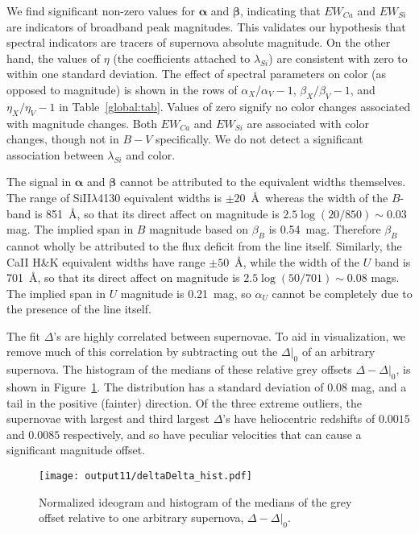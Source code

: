 \documentclass{aastex61}   	%
\begin{document}
We find significant non-zero values for $\pmb{\alpha}$ and $\pmb{\beta}$, indicating that $EW_{Ca}$ and $EW_{Si}$ are indicators of broadband
peak magnitudes.
This validates our hypothesis that spectral indicators
are tracers of supernova absolute magnitude.  On the other hand, the values of $\eta$ (the coefficients attached to $\lambda_{Si}$) are consistent with zero
to  within one standard deviation.
The effect of spectral parameters on color (as opposed to magnitude)
is shown in the rows of $\alpha_X/\alpha_V-1$,  $\beta_X/\beta_V-1$, and  $\eta_X/\eta_V-1$
in Table~\ref{global:tab}.
Values of zero signify no color changes associated with magnitude changes.
Both $EW_{Ca}$ and $EW_{Si}$ are associated with color changes, though not in $B-V$ specifically.
We do not detect a significant association between
$\lambda_{Si}$ and color.

The signal in  $\pmb{\alpha}$ and $\pmb{\beta}$ cannot be attributed to the equivalent widths themselves.
The range of SiII$\lambda$4130 equivalent widths is $\pm 20$~\AA\ whereas the width of the $B$-band is 851~\AA, so that its direct affect on magnitude
is
$2.5 \log{(20/850)} \sim 0.03$ mag.  
The implied span in $B$ magnitude based on $\beta_B$ is 0.54~mag.  Therefore $\beta_B$ cannot wholly be attributed to the flux deficit
from the line itself.
Similarly, the CaII H\&K equivalent widths have range $\pm 50$~\AA, while the width of the $U$ band is
701~\AA, so that its direct affect on magnitude
is
$2.5 \log{(50/701)} \sim 0.08$ mags.   The implied span in $U$ magnitude is  0.21~mag, so $\alpha_U$ cannot be completely due to the 
presence of the line itself.

The fit $\Delta$'s are highly correlated between supernovae.  To aid in visualization, we remove much of this
correlation by subtracting out the $\Delta|_0$ of  an arbitrary supernova.
The histogram of the medians of these relative  grey offsets $\Delta-\Delta|_0$,
is shown in Figure~\ref{hist:fig}.  The distribution
has a standard deviation of
$0.08$
mag, and a tail in the positive (fainter) direction. 
Of the three extreme outliers, the supernovae with largest and third largest $\Delta$'s have  heliocentric redshifts of 
 $0.0015$ and $0.0085$ respectively, and so have peculiar velocities that can cause a significant magnitude offset.

\begin{figure}[htbp] %
   \centering
   \texttt{[image: output11/deltaDelta\_hist.pdf]} 
   \caption{
   Normalized ideogram and histogram of the medians of the grey offset relative to one arbitrary supernova, $\Delta-\Delta|_0$.  
   \label{hist:fig}}
\end{figure}
\end{document}
